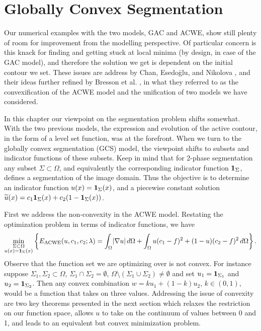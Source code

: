 \chapter{Globally Convex Segmentation}
\label{ch:gcs}
Our numerical examples with the two models, GAC and ACWE, show still plenty of room for improvement from the modelling perspective. Of particular concern is this knack for finding and getting stuck at local minima (by design, in case of the GAC model), and therefore the solution we get is dependent on the initial contour we set. These issues are address by Chan, Esedo\={g}lu, and Nikolova \cite{chan2006algorithms}, and their ideas further refined by Bresson et al. \cite{bresson2007fast}, in what they referred to as the convexification of the ACWE model and the unification of two models we have considered.

In this chapter our viewpoint on the segmentation problem shifts somewhat. With the two previous models, the expression and evolution of the active contour, in the form of a level set function, was at the forefront. When we turn to the globally convex segmentation (GCS) model, the viewpoint shifts to subsets and indicator functions of these subsets. Keep in mind that for 2-phase segmentation any subset $\Sigma \subset \Omega$, and equivalently the corresponding indicator function $\mathbf{1}_\Sigma$, defines a segmentation of the image domain. Thus the objective is to determine an indicator function $u(x) = \mathbf{1}_\Sigma(x)$, and a piecewise constant solution $\widetilde u(x) = c_1 \mathbf{1}_\Sigma(x) + c_2 (1 - \mathbf{1}_\Sigma(x))$. 

First we address the non-convexity in the ACWE model. Restating the optimization problem in terms of indicator functions, we have 
\begin{align}
\min_{\substack{\Sigma\subset\Omega \\ 
		u(x) = \mathbf{1}_\Sigma(x)}} 
\left\{E_\textrm{ACWE}(u, c_1, c_2; \lambda)
= \int_{\Omega} \lvert\nabla u\rvert \,d\Omega 
+ \int_\Omega u(c_1 - f)^2   + (1-u)(c_2 - f)^2 \,d\Omega 
\right\}.
\label{eq:eacwe2}
\end{align}
Observe that the function set we are optimizing over is not convex. For instance suppose $\Sigma_1, \Sigma_2 \subset \Omega$, $\Sigma_1 \cap \Sigma_2 = \emptyset$, $\Omega \setminus (\Sigma_1 \cup \Sigma_2) \neq \emptyset$ and set $u_1 = \mathbf{1}_{\Sigma_1}$ and $u_2 = \mathbf{1}_{\Sigma_2}$. Then any convex combination $w = ku_1 + (1-k)u_2$, $k \in (0,1)$, would be a function that takes on three values. Addressing the issue of convexity are two key theorems presented in the next section which relaxes the restriction on our function space, allows $u$ to take on the continuum of values between 0 and 1, and leads to an equivalent but convex minimization problem.

